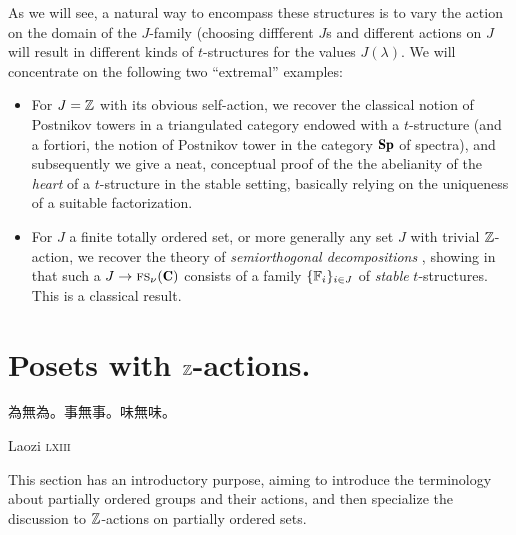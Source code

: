 \documentclass[a4paper,12pt]{amsart}
\begin{document}
As we will see, a natural way to encompass these structures is to vary the action on the domain of the $J$-family (choosing diffferent $J$s and different actions on $J$ will result in different kinds of $t$-structures for the values $J(\lambda)$. We will concentrate on the following two ``extremal'' examples:
\begin{itemize}
\item For $J=\mathbb{Z}$ with its obvious self-action, we recover the classical notion of Postnikov towers in a triangulated category endowed with a $t$-structure (and a fortiori, the notion of Postnikov tower in the category $\cate{Sp}$ of spectra), and subsequently we give a neat, conceptual proof of the the abelianity of the \emph{heart} of a $t$-structure in the stable setting, basically relying on the uniqueness of a suitable factorization. 

\item For $J$ a finite totally ordered set, or more generally any set $J$ with trivial $\mathbb{Z}$-action, we recover the theory of \emph{semiorthogonal decompositions} \cite{Bondal1995, Kuz}, showing in \athm {} that such a $J\to \fs_\nu(\C)$ consists of a family $\{\mathbb{F}_i\}_{i\in J}$ of \emph{stable} $t$-structures. This is a classical result.
\end{itemize}
\section{Posets with \texorpdfstring{$\mathbb{Z}$}{Z}-actions.}
\epigraph{\begin{CJK*}{UTF8}{bsmi} 為無為。事無事。味無味。\end{CJK*}}{Laozi \textsc{lxiii}}
This section has an introductory purpose, aiming to introduce the terminology about partially ordered groups and their actions, and then specialize the discussion to $\mathbb{Z}$-actions on partially ordered sets.
\end{document}
